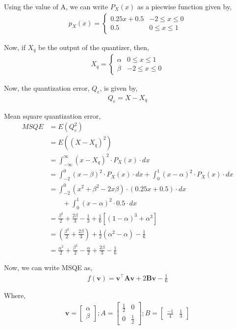 \documentclass[]{article}
\begin{document}
Using the value of A, we can write $P_X(x)$ as a piecwise function given by,
\begin{align}
    p_X(x) = 
    \begin{cases}
        0.25x + 0.5 & -2\leq x\leq 0 \\
        0.5 & 0\leq x \leq1
    \end{cases}
\end{align}

Now, if $X_q$ be the output of the quantizer, then,
\begin{align}
    X_q = 
    \begin{cases}
        \alpha & 0\leq x \leq1 \\
        \beta & -2\leq x\leq 0
    \end{cases}
\end{align}

Now, the quantization error, $Q_e$, is given by,
\begin{align}
    Q_e = X-X_q
\end{align}

Mean square quantization error, 
\begin{align}
    MSQE &= E(Q_e^2) \\
    &= E((X-X_q)^2) \\
    &= \int_{-\infty}^{\infty}(x-X_q)^2\cdot P_X(x)\cdot dx \\
    &= \int_{-2}^{0}(x-\beta)^2\cdot P_X(x)\cdot dx + \int_{0}^{1}(x-\alpha)^2\cdot P_X(x)\cdot dx \\
    &= \int_{-2}^{0}(x^2+\beta ^2-2x\beta)\cdot (0.25x+0.5)\cdot dx \\ &\qquad + \int_{0}^{1}(x-\alpha)^2\cdot 0.5\cdot dx \\
    &= \frac{\beta ^2}{2} + \frac{2\beta}{3} -\frac{1}{3} + \frac{1}{6}[(1-\alpha)^3+\alpha ^3] \\
    &= (\frac{\beta ^2}{2} + \frac{2\beta}{3}) + \frac{1}{2}(\alpha ^2 - \alpha) - \frac{1}{6} \\
    &= \frac{\alpha ^2}{2} + \frac{\beta ^2}{2} - \frac{\alpha}{2} + \frac{2\beta}{3} - \frac{1}{6} 
\end{align}

Now, we can write MSQE as,
\begin{align}
    f(\mathbf{v}) = \mathbf{v}^\intercal \mathbf{A} \mathbf{v} + 2 \mathbf{B} \mathbf{v} - \frac{1}{6}
\end{align}

Where, 
\begin{align}
    \mathbf{v} = 
    \begin{bmatrix}
        \alpha \\
        \beta
    \end{bmatrix};
    A =
    \begin{bmatrix}
        \frac{1}{2} & 0 \\
        0 & \frac{1}{2}
    \end{bmatrix}; 
    B = 
    \begin{bmatrix}
        \frac{-1}{4} & \frac{1}{3}
    \end{bmatrix}
\end{align}
\end{document}
